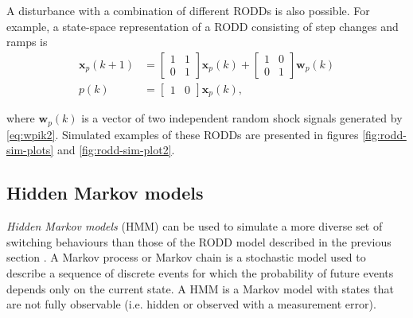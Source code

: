 A disturbance with a combination of different \gls{RODD}s is also possible.  For example, a state-space representation of a \gls{RODD} consisting of step changes and ramps is
\begin{equation} \label{eq:RODD-step-ramp}
	\begin{split}
		\mathbf{x}_p(k+1) & =\left[\begin{array}{cc}
			1 & 1 \\
			0 & 1
		\end{array}\right] \mathbf{x}_p(k) +\left[\begin{array}{cc}
			1 & 0 \\
			0 & 1
		\end{array}\right] \mathbf{w}_p(k) \\
		p(k) & =\left[\begin{array}{cc}
			1 & 0
		\end{array}\right] \mathbf{x}_p(k),
	\end{split}
\end{equation}

where $\mathbf{w}_p(k)$ is a vector of two independent random shock signals generated by \eqref{eq:wpik2}. Simulated examples of these \gls{RODD}s are presented in figures \ref{fig:rodd-sim-plots} and \ref{fig:rodd-sim-plot2}.

\subsection{Hidden Markov models} \label{sec:HMM}

\textit{Hidden Markov models} (\gls{HMM}) can be used to simulate a more diverse set of switching behaviours than those of the \gls{RODD} model described in the previous section \citep{wong_realistic_2009}. A Markov process or Markov chain is a stochastic model used to describe a sequence of discrete events for which the probability of future events depends only on the current state. A \gls{HMM} is a Markov model with states that are not fully observable (i.e. hidden or observed with a measurement error).

